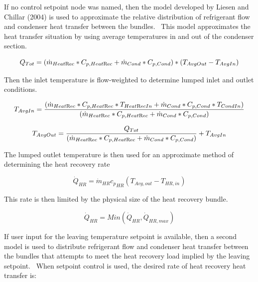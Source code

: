 If no control setpoint node was named, then the model developed by Liesen and Chillar (2004) is used to approximate the relative distribution of refrigerant flow and condenser heat transfer between the bundles.~ This model approximates the heat transfer situation by using average temperatures in and out of the condenser section.

\begin{equation}
{Q_{Tot}} = ({\dot m_{Heat{\mathop{\rm Re}\nolimits} c}}*{C_{p,Heat{\mathop{\rm Re}\nolimits} c}} + {\dot m_{Cond}}*{C_{p,Cond}})*({T_{AvgOut}} - {T_{AvgIn}})
\end{equation}

Then the inlet temperature is flow-weighted to determine lumped inlet and outlet conditions.

\begin{equation}
{T_{AvgIn}} = \frac{{({{\dot m}_{Heat{\mathop{\rm Re}\nolimits} c}}*{C_{p,Heat{\mathop{\rm Re}\nolimits} c}}*{T_{Heat{\mathop{\rm Re}\nolimits} cIn}} + {{\dot m}_{Cond}}*{C_{p,Cond}}*{T_{CondIn}})}}{{({{\dot m}_{Heat{\mathop{\rm Re}\nolimits} c}}*{C_{p,Heat{\mathop{\rm Re}\nolimits} c}} + {{\dot m}_{Cond}}*{C_{p,Cond}})}}
\end{equation}

\begin{equation}
{T_{AvgOut}} = \frac{{{Q_{Tot}}}}{{({{\dot m}_{Heat{\mathop{\rm Re}\nolimits} c}}*{C_{p,Heat{\mathop{\rm Re}\nolimits} c}} + {{\dot m}_{Cond}}*{C_{p,Cond}})}} + {T_{AvgIn}}
\end{equation}

The lumped outlet temperature is then used for an approximate method of determining the heat recovery rate

\begin{equation}
{\dot Q_{HR}} = {\dot m_{HR}}{c_p}_{HR}\left( {{T_{Avg,out}} - {T_{HR,in}}} \right)
\end{equation}

This rate is then limited by the physical size of the heat recovery bundle.

\begin{equation}
{\dot Q_{HR}} = Min\left( {{{\dot Q}_{HR}},{{\dot Q}_{HR,max}}} \right)
\end{equation}

If user input for the leaving temperature setpoint is available, then a second model is used to distribute refrigerant flow and condenser heat transfer between the bundles that attempts to meet the heat recovery load implied by the leaving setpoint.~ When setpoint control is used, the desired rate of heat recovery heat transfer is:

